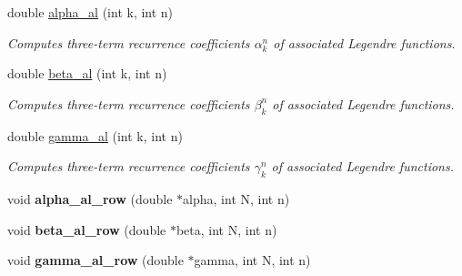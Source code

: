 \begin{CompactItemize}
\item 
double \hyperlink{group__nfsft_ga12}{alpha\_\-al} (int k, int n)
\begin{CompactList}\small\item\em Computes three-term recurrence coefficients $\alpha_k^n$ of associated Legendre functions. \item\end{CompactList}\item 
double \hyperlink{group__nfsft_ga13}{beta\_\-al} (int k, int n)
\begin{CompactList}\small\item\em Computes three-term recurrence coefficients $\beta_k^n$ of associated Legendre functions. \item\end{CompactList}\item 
double \hyperlink{group__nfsft_ga14}{gamma\_\-al} (int k, int n)
\begin{CompactList}\small\item\em Computes three-term recurrence coefficients $\gamma_k^n$ of associated Legendre functions. \item\end{CompactList}\item 
\hypertarget{group__nfsft_ga15}{
void {\bf alpha\_\-al\_\-row} (double $\ast$alpha, int N, int n)}
\label{group__nfsft_ga15}

\item 
\hypertarget{group__nfsft_ga16}{
void {\bf beta\_\-al\_\-row} (double $\ast$beta, int N, int n)}
\label{group__nfsft_ga16}

\item 
\hypertarget{group__nfsft_ga17}{
void {\bf gamma\_\-al\_\-row} (double $\ast$gamma, int N, int n)}
\label{group__nfsft_ga17}


\end{CompactItemize}
